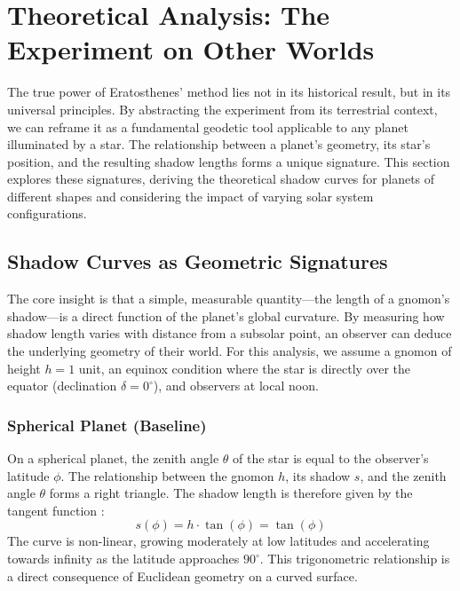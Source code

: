 \documentclass[11pt]{article}
\begin{document}
\section{Theoretical Analysis: The Experiment on Other Worlds}

The true power of Eratosthenes’ method lies not in its historical result, but in its universal principles. By abstracting the experiment from its terrestrial context, we can reframe it as a fundamental geodetic tool applicable to any planet illuminated by a star. The relationship between a planet's geometry, its star's position, and the resulting shadow lengths forms a unique signature. This section explores these signatures, deriving the theoretical shadow curves for planets of different shapes and considering the impact of varying solar system configurations.

\subsection{Shadow Curves as Geometric Signatures}

The core insight is that a simple, measurable quantity—the length of a gnomon's shadow—is a direct function of the planet’s global curvature. By measuring how shadow length varies with distance from a subsolar point, an observer can deduce the underlying geometry of their world. For this analysis, we assume a gnomon of height $h = 1$ unit, an equinox condition where the star is directly over the equator (declination $\delta = 0^{\circ}$), and observers at local noon.

\subsubsection{Spherical Planet (Baseline)}
On a spherical planet, the zenith angle $\theta$ of the star is equal to the observer's latitude $\phi$. The relationship between the gnomon $h$, its shadow $s$, and the zenith angle $\theta$ forms a right triangle. The shadow length is therefore given by the tangent function \cite{Cox2011}:
\begin{equation}
    s(\phi) = h \cdot \tan(\phi) = \tan(\phi)
    \label{eq:shadow_sphere}
\end{equation}
The curve is non-linear, growing moderately at low latitudes and accelerating towards infinity as the latitude approaches $90^{\circ}$. This trigonometric relationship is a direct consequence of Euclidean geometry on a curved surface.
\end{document}
